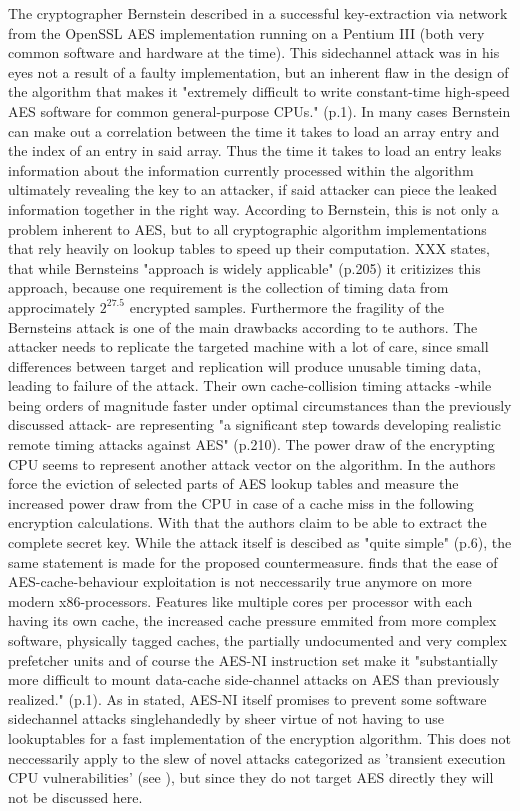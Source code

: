 The cryptographer Bernstein described in \cite{bernsteincache} a successful key-extraction via network from the OpenSSL AES implementation running on a Pentium III (both very common software and hardware at the time). This sidechannel attack was in his eyes not a result of a faulty implementation, but an inherent flaw in the design of the algorithm that makes it "extremely difficult to write constant-time high-speed AES software for common general-purpose CPUs." (p.1). In many cases Bernstein can make out a correlation between the time it takes to load an array entry and the index of an entry in said array. Thus the time it takes to load an entry leaks information about the information currently processed within the algorithm ultimately revealing the key to an attacker, if said attacker can piece the leaked information together in the right way.
According to Bernstein, this is not only a problem inherent to AES, but to all cryptographic algorithm implementations that rely heavily on lookup tables to speed up their computation.
\cite{improvedcache} XXX states, that while Bernsteins "approach is widely applicable" (p.205) it critizizes this approach, because one requirement is the collection of timing data from approcimately $2^{27.5}$ encrypted samples. Furthermore the fragility of the Bernsteins attack is one of the main drawbacks according to te authors. The attacker needs to replicate the targeted machine with a lot of care, since small differences between target and replication will produce unusable timing data, leading to failure of the attack. Their own cache-collision timing attacks -while being orders of magnitude faster under optimal circumstances than the previously discussed attack- are representing "a significant step towards developing realistic remote timing attacks against AES" (p.210).
The power draw of the encrypting CPU seems to represent another attack vector on the algorithm. In \cite{powerdraw} the authors force the eviction of selected parts of AES lookup tables and measure the increased power draw from the CPU in case of a cache miss in the following encryption calculations. With that the authors claim to be able to extract the complete secret key. While the attack itself is descibed as "quite simple" (p.6), the same statement is made for the proposed countermeasure.
\cite{ctattacksfeasible} finds that the ease of AES-cache-behaviour exploitation is not neccessarily true anymore on more modern x86-processors. Features like multiple cores per processor with each having its own cache, the increased cache pressure emmited from more complex software, physically tagged caches, the partially undocumented and very complex prefetcher units and of course the AES-NI instruction set make it "substantially more difficult to mount data-cache side-channel attacks on AES than previously realized." (p.1). As in \cite{aes-ni} stated, AES-NI itself promises to prevent some software sidechannel attacks singlehandedly by sheer virtue of not having to use lookuptables for a fast implementation of the encryption algorithm.
This does not neccessarily apply to the slew of novel attacks categorized as 'transient execution CPU vulnerabilities' (see \cite{transientexecution}), but since they do not target AES directly they will not be discussed here.

